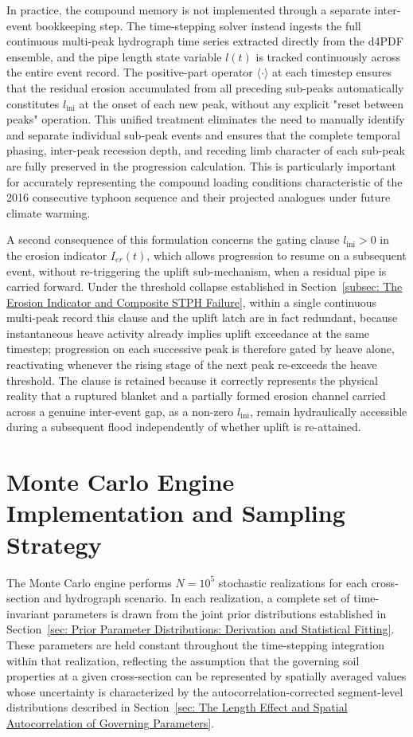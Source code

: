 In practice, the compound memory is not implemented through a separate inter-event bookkeeping step. The time-stepping solver instead ingests the full continuous multi-peak hydrograph time series extracted directly from the d4PDF ensemble, and the pipe length state variable $l(t)$ is tracked continuously across the entire event record. The positive-part operator $\langle\cdot\rangle$ at each timestep ensures that the residual erosion accumulated from all preceding sub-peaks automatically constitutes $l_\mathrm{ini}$ at the onset of each new peak, without any explicit "reset between peaks" operation. This unified treatment eliminates the need to manually identify and separate individual sub-peak events and ensures that the complete temporal phasing, inter-peak recession depth, and receding limb character of each sub-peak are fully preserved in the progression calculation. This is particularly important for accurately representing the compound loading conditions characteristic of the 2016 consecutive typhoon sequence and their projected analogues under future climate warming.

A second consequence of this formulation concerns the gating clause $l_\mathrm{ini} > 0$ in the erosion indicator $I_{er}(t)$, which allows progression to resume on a subsequent event, without re-triggering the uplift sub-mechanism, when a residual pipe is carried forward. Under the threshold collapse established in Section~\ref{subsec: The Erosion Indicator and Composite STPH Failure}, within a single continuous multi-peak record this clause and the uplift latch are in fact redundant, because instantaneous heave activity already implies uplift exceedance at the same timestep; progression on each successive peak is therefore gated by heave alone, reactivating whenever the rising stage of the next peak re-exceeds the heave threshold. The clause is retained because it correctly represents the physical reality that a ruptured blanket and a partially formed erosion channel carried across a genuine inter-event gap, as a non-zero $l_\mathrm{ini}$, remain hydraulically accessible during a subsequent flood independently of whether uplift is re-attained.

\section{Monte Carlo Engine Implementation and Sampling Strategy}
\label{sec: Monte Carlo Engine Implementation and Sampling Strategy}

The Monte Carlo engine performs $N = 10^5$ stochastic realizations for each cross-section and hydrograph scenario. In each realization, a complete set of time-invariant parameters is drawn from the joint prior distributions established in Section~\ref{sec: Prior Parameter Distributions: Derivation and Statistical Fitting}. These parameters are held constant throughout the time-stepping integration within that realization, reflecting the assumption that the governing soil properties at a given cross-section can be represented by spatially averaged values whose uncertainty is characterized by the autocorrelation-corrected segment-level distributions described in Section~\ref{sec: The Length Effect and Spatial Autocorrelation of Governing Parameters}.

